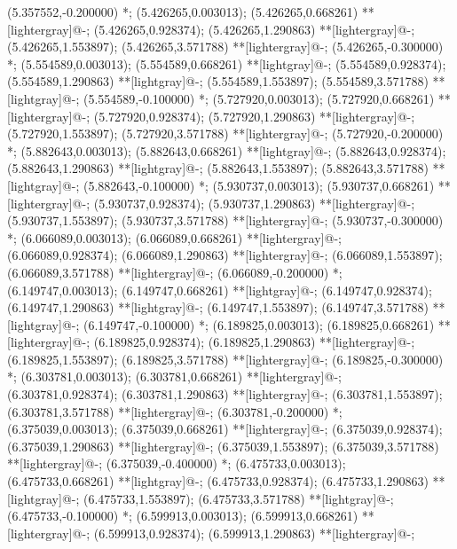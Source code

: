 (5.357552,-0.200000) *{};
(5.426265,0.003013); (5.426265,0.668261) **[lightergray]@{-};
(5.426265,0.928374); (5.426265,1.290863) **[lightergray]@{-};
(5.426265,1.553897); (5.426265,3.571788) **[lightergray]@{-};
(5.426265,-0.300000) *{};
(5.554589,0.003013); (5.554589,0.668261) **[lightgray]@{-};
(5.554589,0.928374); (5.554589,1.290863) **[lightgray]@{-};
(5.554589,1.553897); (5.554589,3.571788) **[lightgray]@{-};
(5.554589,-0.100000) *{};
(5.727920,0.003013); (5.727920,0.668261) **[lightergray]@{-};
(5.727920,0.928374); (5.727920,1.290863) **[lightergray]@{-};
(5.727920,1.553897); (5.727920,3.571788) **[lightergray]@{-};
(5.727920,-0.200000) *{};
(5.882643,0.003013); (5.882643,0.668261) **[lightgray]@{-};
(5.882643,0.928374); (5.882643,1.290863) **[lightgray]@{-};
(5.882643,1.553897); (5.882643,3.571788) **[lightgray]@{-};
(5.882643,-0.100000) *{};
(5.930737,0.003013); (5.930737,0.668261) **[lightergray]@{-};
(5.930737,0.928374); (5.930737,1.290863) **[lightergray]@{-};
(5.930737,1.553897); (5.930737,3.571788) **[lightergray]@{-};
(5.930737,-0.300000) *{};
(6.066089,0.003013); (6.066089,0.668261) **[lightergray]@{-};
(6.066089,0.928374); (6.066089,1.290863) **[lightergray]@{-};
(6.066089,1.553897); (6.066089,3.571788) **[lightergray]@{-};
(6.066089,-0.200000) *{};
(6.149747,0.003013); (6.149747,0.668261) **[lightgray]@{-};
(6.149747,0.928374); (6.149747,1.290863) **[lightgray]@{-};
(6.149747,1.553897); (6.149747,3.571788) **[lightgray]@{-};
(6.149747,-0.100000) *{};
(6.189825,0.003013); (6.189825,0.668261) **[lightergray]@{-};
(6.189825,0.928374); (6.189825,1.290863) **[lightergray]@{-};
(6.189825,1.553897); (6.189825,3.571788) **[lightergray]@{-};
(6.189825,-0.300000) *{};
(6.303781,0.003013); (6.303781,0.668261) **[lightergray]@{-};
(6.303781,0.928374); (6.303781,1.290863) **[lightergray]@{-};
(6.303781,1.553897); (6.303781,3.571788) **[lightergray]@{-};
(6.303781,-0.200000) *{};
(6.375039,0.003013); (6.375039,0.668261) **[lightergray]@{-};
(6.375039,0.928374); (6.375039,1.290863) **[lightergray]@{-};
(6.375039,1.553897); (6.375039,3.571788) **[lightergray]@{-};
(6.375039,-0.400000) *{};
(6.475733,0.003013); (6.475733,0.668261) **[lightgray]@{-};
(6.475733,0.928374); (6.475733,1.290863) **[lightgray]@{-};
(6.475733,1.553897); (6.475733,3.571788) **[lightgray]@{-};
(6.475733,-0.100000) *{};
(6.599913,0.003013); (6.599913,0.668261) **[lightergray]@{-};
(6.599913,0.928374); (6.599913,1.290863) **[lightergray]@{-};
